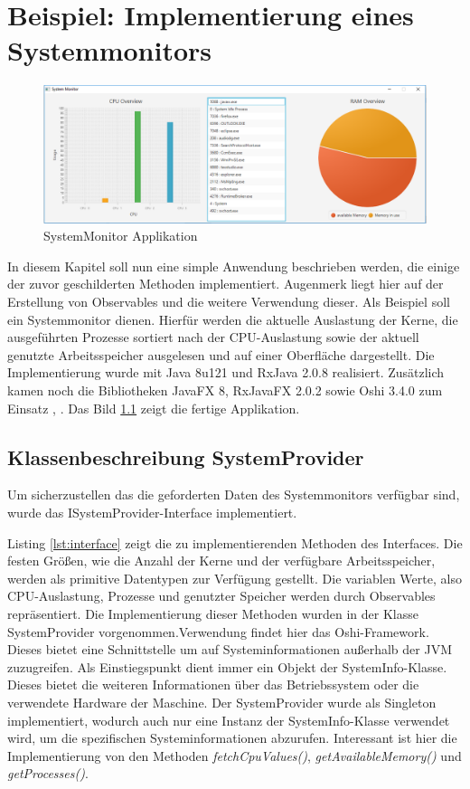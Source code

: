 \chapter{Beispiel: Implementierung eines Systemmonitors}\label{beispiel}
\begin{figure}[hbt]
	\centering
	\includegraphics[width=1\textwidth]{Abb/sysmon}
	\caption{SystemMonitor Applikation}
	\label{pic:sysmon}
\end{figure}
In diesem Kapitel soll nun eine simple Anwendung beschrieben werden, die einige der zuvor geschilderten Methoden implementiert. Augenmerk liegt hier auf der Erstellung von Observables und die weitere Verwendung dieser. Als Beispiel soll ein Systemmonitor dienen. Hierfür werden die aktuelle Auslastung der Kerne, die ausgeführten Prozesse sortiert nach der CPU-Auslastung sowie der aktuell genutzte Arbeitsspeicher ausgelesen und auf einer Oberfläche dargestellt. Die Implementierung wurde mit Java 8u121 und RxJava 2.0.8 realisiert. Zusätzlich kamen noch die Bibliotheken JavaFX 8, RxJavaFX 2.0.2 sowie Oshi 3.4.0 zum Einsatz \cite{rxajavafx}, \cite{oshi}. Das Bild \ref{pic:sysmon} zeigt die fertige Applikation.
\section{Klassenbeschreibung SystemProvider}
Um sicherzustellen das die geforderten Daten des Systemmonitors verfügbar sind, wurde das ISystemProvider-Interface implementiert. 
 
Listing \ref{lst:interface} zeigt die zu implementierenden Methoden des Interfaces. Die festen Größen, wie die Anzahl der Kerne und der verfügbare Arbeitsspeicher, werden als primitive Datentypen zur Verfügung gestellt. Die variablen Werte, also CPU-Auslastung, Prozesse und genutzter Speicher werden durch Observables repräsentiert. Die Implementierung dieser Methoden wurden in der Klasse SystemProvider vorgenommen.Verwendung findet hier das Oshi-Framework. Dieses bietet eine Schnittstelle um auf Systeminformationen außerhalb der JVM zuzugreifen. Als Einstiegspunkt dient immer ein Objekt der SystemInfo-Klasse. Dieses bietet die weiteren Informationen über das Betriebssystem oder die verwendete Hardware der Maschine. Der SystemProvider wurde als Singleton implementiert, wodurch auch nur eine Instanz der SystemInfo-Klasse verwendet wird, um die spezifischen Systeminformationen abzurufen. Interessant ist hier die Implementierung von den Methoden \textit{fetchCpuValues()}, \textit{getAvailableMemory()} und \textit{getProcesses()}. 
